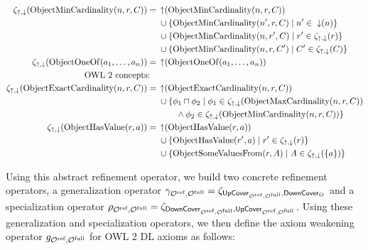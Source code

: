 {\begin{align*}
    \zeta_{\mathop{\uparrow}, \mathop{\downarrow}}(\mathrm{ObjectMinCardinality}(n, r, C)) ={} & \mathop{\uparrow} (\mathrm{ObjectMinCardinality}(n, r, C)) \\& \cup \{\mathrm{ObjectMinCardinality}(n', r, C) \mid n' \in \; \mathop{\downarrow} (n)\} \\& \cup \{\mathrm{ObjectMinCardinality}(n, r', C) \mid r' \in \zeta_{\mathop{\uparrow}, \mathop{\downarrow}}(r)\} \\& \cup \{\mathrm{ObjectMinCardinality}(n, r, C') \mid C' \in \zeta_{\mathop{\uparrow}, \mathop{\downarrow}} (C)\} \\
    \zeta_{\mathop{\uparrow}, \mathop{\downarrow}}(\mathrm{ObjectOneOf}(a_1, \dots, a_n)) ={} & \mathop{\uparrow} (\mathrm{ObjectOneOf}(a_1, \dots, a_n)) \\
    \text{OWL 2 concepts:} \quad & \\
    \zeta_{\mathop{\uparrow}, \mathop{\downarrow}}(\mathrm{ObjectExactCardinality}(n, r, C)) ={} & \mathop{\uparrow} (\mathrm{ObjectExactCardinality}(n, r, C)) \\& \cup \{ \phi_1 \sqcap \phi_2   \mid \phi_1 \in \zeta_{\mathop{\uparrow}, \mathop{\downarrow}} (\mathrm{ObjectMaxCardinality}(n, r, C)) \\ \;& \qquad \land \phi_2 \in \zeta_{\mathop{\uparrow}, \mathop{\downarrow}} (\mathrm{ObjectMinCardinality}(n, r, C)) \} \\
    \zeta_{\mathop{\uparrow}, \mathop{\downarrow}}(\mathrm{ObjectHasValue}(r, a)) ={} & \mathop{\uparrow} (\mathrm{ObjectHasValue}(r, a)) \\&  \cup \{\mathrm{ObjectHasValue}(r', a) \mid r' \in \zeta_{\mathop{\uparrow}, \mathop{\downarrow}} (r)\} \\&  \cup \{\mathrm{ObjectSomeValuesFrom}(r, A) \mid A \in \zeta_{\mathop{\uparrow}, \mathop{\downarrow}}  (\{a\})\}
\end{align*}
}

Using this abstract refinement operator, we build two concrete refinement operators, a generalization operator $\gamma_{{\mathcal{O}^\textnormal{ref}},{\mathcal{O}^\textnormal{full}}} = \zeta_{{\mathsf{UpCover}}_{{\mathcal{O}^\textnormal{ref}},{\mathcal{O}^\textnormal{full}}}, {\mathsf{DownCover}}_\mathrm{O}}$ and a specialization operator $\rho_{{\mathcal{O}^\textnormal{ref}},{\mathcal{O}^\textnormal{full}}} = \zeta_{{\mathsf{DownCover}}_{{\mathcal{O}^\textnormal{ref}},{\mathcal{O}^\textnormal{full}}}, {\mathsf{UpCover}}_{{\mathcal{O}^\textnormal{ref}},{\mathcal{O}^\textnormal{full}}}}$. Using these generalization and specialization operators, we then define the axiom weakening operator $g_{{\mathcal{O}^\textnormal{ref}},{\mathcal{O}^\textnormal{full}}}$ for OWL 2 DL axioms as follows:

